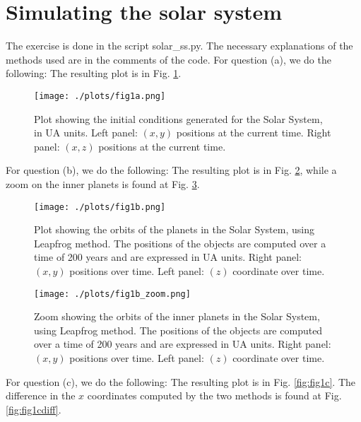 \section{Simulating the solar system}
The exercise is done in the script solar_ss.py. The necessary explanations of the methods used are in the comments of the code. 
For question (a), we do the following:  
The resulting plot is in Fig. \ref{fig:fig1a}.

\begin{figure}[h!]
    \centering
    \texttt{[image: ./plots/fig1a.png]}
    \caption{Plot showing the initial conditions generated for the Solar System, in UA units. Left panel: $(x,y)$ positions at the current time. Right panel: $(x,z)$ positions at the current time.}
    \label{fig:fig1a}
  \end{figure}

For question (b), 
we do the following: 
The resulting plot is in Fig. \ref{fig:fig1b}, while a zoom on the inner planets is found at Fig. \ref{fig:fig1bzoom}.

\begin{figure}[h!]
    \centering
    \texttt{[image: ./plots/fig1b.png]}
    \caption{Plot showing the orbits of the planets in the Solar System, using Leapfrog method.
    The positions of the objects are computed over a time of 200 years and are expressed in UA units. Right panel: $(x,y)$ positions over time. Left panel: $(z)$ coordinate over time.} 
    \label{fig:fig1b}
  \end{figure}

  \begin{figure}[h!]
    \centering
    \texttt{[image: ./plots/fig1b\_zoom.png]}
    \caption{Zoom showing the orbits of the inner planets in the Solar System, using Leapfrog method.
    The positions of the objects are computed over a time of 200 years and are expressed in UA units. Right panel: $(x,y)$ positions over time. Left panel: $(z)$ coordinate over time.} 
    \label{fig:fig1bzoom}
  \end{figure}

For question (c), 
we do the following: 
The resulting plot is in Fig. \ref{fig:fig1c}. The difference in the $x$ coordinates computed by the two methods is found at Fig. \ref{fig:fig1cdiff}.

